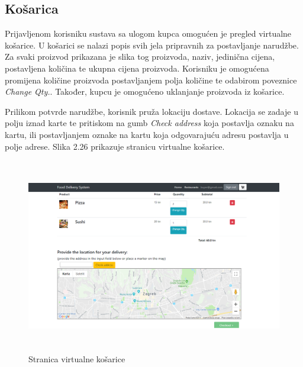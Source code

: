 \documentclass[times, utf8, zavrsni, numeric]{fer}
\begin{document}
\subsection{Košarica}
Prijavljenom korisniku sustava sa ulogom kupca omogućen je pregled virtualne košarice. U košarici se nalazi popis svih jela pripravnih za postavljanje narudžbe. Za svaki proizvod prikazana je slika tog proizvoda, naziv, jedinična cijena, postavljena količina te ukupna cijena proizvoda. Korisniku je omogućena promijena količine proizvoda postavljanjem polja količine te odabirom poveznice \emph{Change Qty.}. Također, kupcu je omogućeno uklanjanje proizvoda iz košarice.

Prilikom potvrde narudžbe, korisnik pruža lokaciju dostave. Lokacija se zadaje u polju iznad karte te pritiskom na gumb \emph{Check address} koja postavlja oznaku na kartu, ili postavljanjem oznake na kartu koja odgovarajuću adresu postavlja u polje adrese. Slika 2.26 prikazuje stranicu virtualne košarice.
\begin{figure}[htb]
\centering
\includegraphics[height=8.5cm]{kosarica.png}
\caption{Stranica virtualne košarice}
\label{fig:kos}
\end{figure}  
\end{document}
